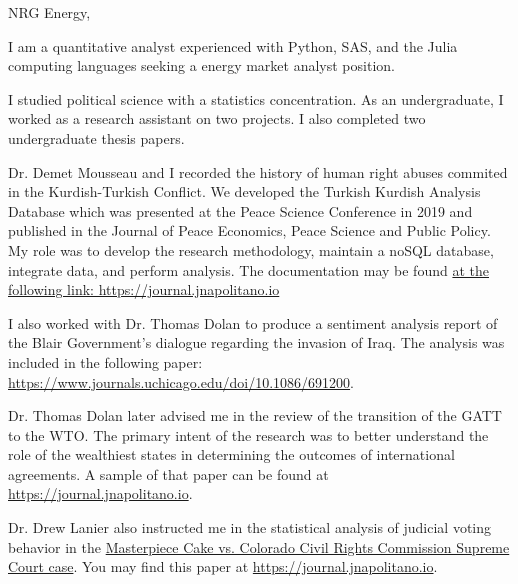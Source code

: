 \documentclass{ExpressiveCoverLetter}
\begin{document}
\coverletterheader[
    firstname=Justin,
    middleinitial=B,
    lastname=Napolitano, 
    email=justin@jnapolitano.io, 
    phone=832-299-0372,            
    city=Houston,
    state=Texas
]


NRG Energy,

\begin{flushleft}
\begin{normalsize} 

    \singlespacing 

    I am a quantitative analyst experienced with Python, SAS, and the Julia computing languages seeking a energy market analyst position.
    
    I studied political science with a statistics concentration.  As an undergraduate, I worked as a research assistant on two projects.  I also completed two undergraduate thesis papers. 

    Dr. Demet Mousseau and I recorded the history of human right abuses commited in the Kurdish-Turkish Conflict. We developed the Turkish Kurdish Analysis Database which was presented at the Peace Science Conference in 2019 and published in the Journal of Peace Economics, Peace Science and Public Policy.  My role was to develop the research methodology, maintain a noSQL database, integrate data, and perform analysis.  The documentation may be found \href{https://journal.jnapolitano.io/parts/articles/project-kurdish-conflict/index.html}{at the following link: https://journal.jnapolitano.io}

    I also worked with Dr. Thomas Dolan to produce a sentiment analysis report of the Blair Government's dialogue regarding the invasion of Iraq.  The analysis was included in the following paper: \href{https://www.journals.uchicago.edu/doi/10.1086/691200}{https://www.journals.uchicago.edu/doi/10.1086/691200}.   
    
    Dr. Thomas Dolan later advised me in the review of the transition of the GATT to the WTO.  The primary intent of the research was to better understand the role of the wealthiest states in determining the outcomes of international agreements.  A sample of that paper can be found at \href{https://journal.jnapolitano.io/parts/articles/project-evolution-of-ngos/index.html}{https://journal.jnapolitano.io}.
    
    Dr. Drew Lanier also instructed me in the statistical analysis of judicial voting behavior in the \href{https://www.law.cornell.edu/supremecourt/text/16-111}{Masterpiece Cake vs. Colorado Civil Rights Commission Supreme Court case}.  You may find this paper at \href{https://journal.jnapolitano.io/parts/articles/project-supcourt-masterpiececake/index.html}{https://journal.jnapolitano.io}.


\end{normalsize}
\end{flushleft}
\end{document}
